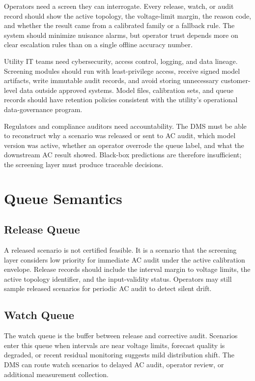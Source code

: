 \documentclass[
  preprint,12pt]{elsarticle}
\begin{document}
Operators need a screen they can interrogate. Every release, watch, or
audit record should show the active topology, the voltage-limit margin,
the reason code, and whether the result came from a calibrated family or
a fallback rule. The system should minimize nuisance alarms, but
operator trust depends more on clear escalation rules than on a single
offline accuracy number.

Utility IT teams need cybersecurity, access control, logging, and data
lineage. Screening modules should run with least-privilege access,
receive signed model artifacts, write immutable audit records, and avoid
storing unnecessary customer-level data outside approved systems. Model
files, calibration sets, and queue records should have retention
policies consistent with the utility's operational data-governance
program.

Regulators and compliance auditors need accountability. The DMS must be
able to reconstruct why a scenario was released or sent to AC audit,
which model version was active, whether an operator overrode the queue
label, and what the downstream AC result showed. Black-box predictions
are therefore insufficient; the screening layer must produce traceable
decisions.

\section{Queue Semantics}\label{queue-semantics}

\subsection{Release Queue}\label{release-queue}

A released scenario is not certified feasible. It is a scenario that the
screening layer considers low priority for immediate AC audit under the
active calibration envelope. Release records should include the interval
margin to voltage limits, the active topology identifier, and the
input-validity status. Operators may still sample released scenarios for
periodic AC audit to detect silent drift.

\subsection{Watch Queue}\label{watch-queue}

The watch queue is the buffer between release and corrective audit.
Scenarios enter this queue when intervals are near voltage limits,
forecast quality is degraded, or recent residual monitoring suggests
mild distribution shift. The DMS can route watch scenarios to delayed AC
audit, operator review, or additional measurement collection.
\end{document}
